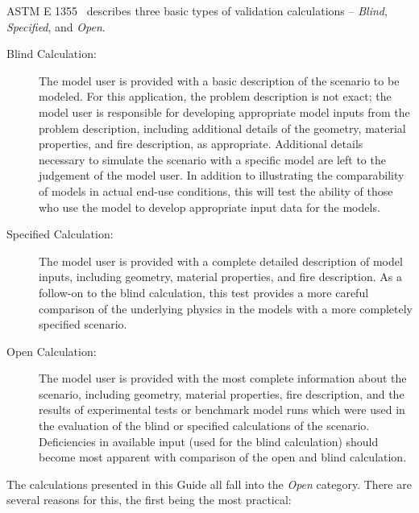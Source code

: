 ASTM E 1355~\cite{ASTM:E1355} describes three basic types of validation calculations -- {\em Blind}, {\em Specified}, and {\em Open}.
\begin{description}
\item [Blind Calculation:] The model user is provided with a basic description of the scenario to be modeled. For this application, the problem description is not exact; the model user is responsible for developing appropriate model inputs from the problem description, including additional details of the geometry, material properties, and fire description, as appropriate. Additional details necessary to simulate the scenario with a specific model are left to the judgement of the model user. In addition to illustrating the comparability of models in actual end-use conditions, this will test the ability of those who use the model to develop appropriate input data for the models.
\item [Specified Calculation:] The model user is provided with a complete detailed description of model inputs, including geometry, material properties, and fire description. As a follow-on to the blind calculation, this test provides a more careful comparison of the underlying physics in the models with a more completely specified scenario.
\item [Open Calculation:] The model user is provided with the most complete information about the scenario, including geometry, material properties, fire description, and the results of experimental tests or benchmark model runs which were used in the evaluation of the blind or specified calculations of the scenario. Deficiencies in available input (used for the blind calculation) should become most apparent with comparison of the open and blind calculation.
\end{description}
The calculations presented in this Guide all fall into the {\em Open} category. There are several reasons for this, the first being the most practical:
